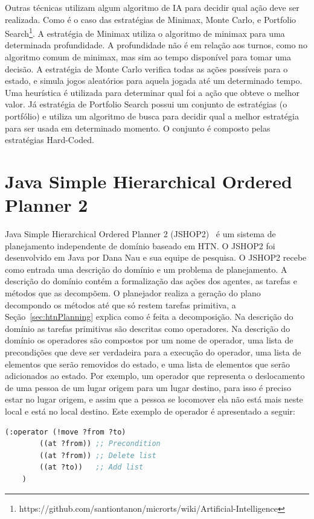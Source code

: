 Outras técnicas utilizam algum algoritmo de IA para decidir qual ação deve ser realizada.
Como é o caso das estratégias de Minimax\cite{ontanon2012minimax}, Monte Carlo, e Portfolio Search\footnote{https://github.com/santiontanon/microrts/wiki/Artificial-Intelligence}.
A estratégia de Minimax utiliza o algoritmo de minimax para uma determinada profundidade. A profundidade não é em relação aos turnos, como no algoritmo comum de minimax, mas sim ao tempo disponível para tomar uma decisão.
A estratégia de Monte Carlo verifica todas as ações possíveis para o estado, e simula jogos aleatórios para aquela jogada até um determinado tempo. Uma heurística é utilizada para determinar qual foi a ação que obteve o melhor valor.
Já estratégia de Portfolio Search possui um conjunto de estratégias (o portfólio) e utiliza um algoritmo de busca para decidir qual a melhor estratégia para ser usada em determinado momento. 
O conjunto é composto pelas estratégias Hard-Coded.

\section{Java Simple Hierarchical Ordered Planner 2}\label{sec:jshop}
		
Java Simple Hierarchical Ordered Planner 2 (JSHOP2)~\cite{nauJSHOP2} é um sistema de planejamento independente de domínio baseado em HTN. 
O JSHOP2 foi desenvolvido em Java por Dana Nau e sua equipe de pesquisa.  
O JSHOP2 recebe como entrada uma descrição do domínio e um problema de planejamento.
A descrição do domínio contém a formalização das ações dos agentes, as tarefas e métodos que as decompõem.
O planejador realiza a geração do plano decompondo os métodos até que só restem tarefas primitiva, a Seção~\ref{sec:htnPlanning} explica como é feita a decomposição. 
Na descrição do domínio as tarefas primitivas são descritas como operadores. 
Na descrição do domínio os operadores são compostos por um nome de operador, uma lista de precondições que deve ser verdadeira para a execução do operador, uma lista de elementos que serão removidos do estado, e uma lista de elementos que serão adicionados ao estado. 
Por exemplo, um operador que representa o deslocamento de uma pessoa de um lugar origem para um lugar destino, para isso é preciso estar no lugar origem, e assim que a pessoa se locomover ela não está mais neste local e está no local destino. Este exemplo de operador é apresentado a seguir:

\lstset{style=codeStyle}
\begin{lstlisting}[language=lisp]
	(:operator (!move ?from ?to) 
		((at ?from)) ;; Precondition
		((at ?from)) ;; Delete list
		((at ?to))   ;; Add list
	)
\end{lstlisting}

